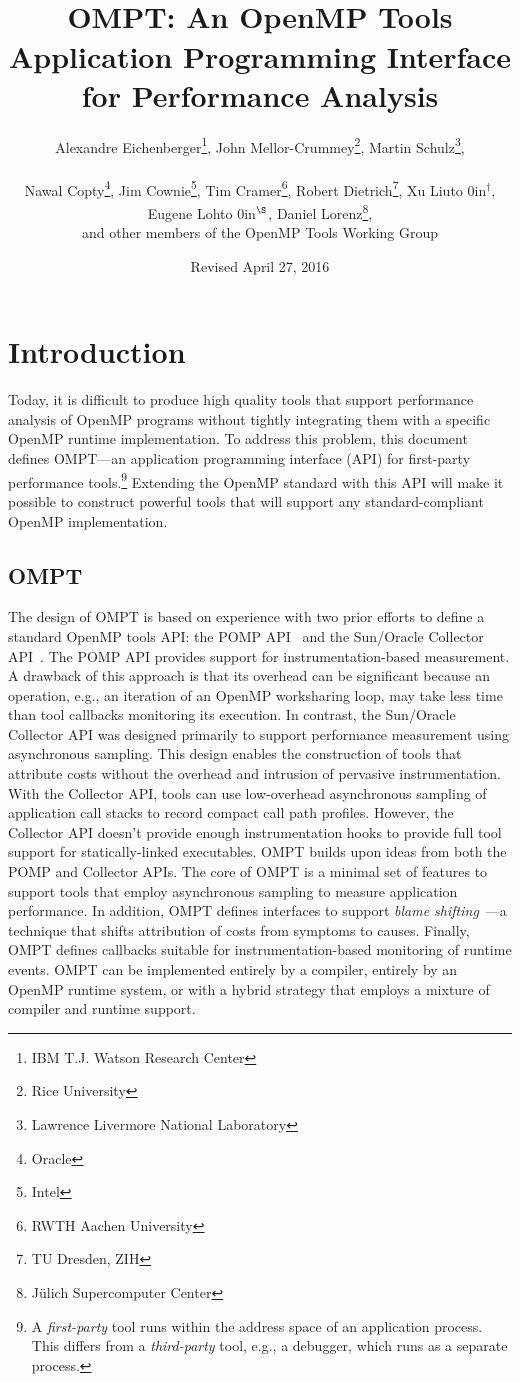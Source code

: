 \documentclass{article}
\title{OMPT: An OpenMP\textsuperscript{\textregistered} Tools Application Programming Interface for Performance Analysis}
\author{Alexandre Eichenberger\thanks{IBM T.J. Watson Research Center}, 
John Mellor-Crummey\thanks{Rice University}, 
Martin Schulz\thanks{Lawrence Livermore National Laboratory},
\\~\\
Nawal Copty\thanks{Oracle}, 
Jim Cownie\thanks{Intel},
Tim Cramer\thanks{RWTH Aachen University}, 
Robert Dietrich\thanks{TU Dresden, ZIH},
Xu Liu\hbox to 0in{$^\dagger$\hss},
Eugene Loh\hbox to 0in{$^\S$\hss}, 
Daniel Lorenz\thanks{J\"{u}lich Supercomputer Center}, 
\\
and other members of the OpenMP Tools Working Group}
\date{Revised April 27, 2016}
\begin{document}
  

                                           
\maketitle
\section{Introduction}
Today, it is difficult to produce high quality tools that support 
performance analysis of OpenMP programs without tightly integrating them with a specific OpenMP runtime implementation. To address this problem, this document defines OMPT---an application programming interface (API) for first-party performance tools.\footnote{A {\em first-party} tool runs within the address space of an application process. This differs from a {\em third-party} tool, e.g., a debugger, which runs as a separate process.}  
Extending the OpenMP standard with this API  will make it possible to construct powerful tools that will support any standard-compliant OpenMP implementation.

\subsection{OMPT}

The design of OMPT is based on experience with two prior efforts to define a standard OpenMP tools API: the POMP API~\cite{Mohr:EWOMP02} and the Sun/Oracle Collector API~\cite{SunCollector,Jost:2005:AND:1892830.1892858}. 
The POMP API provides support for instrumentation-based measurement. A drawback of this approach  is that its overhead can be significant because an operation, e.g., an iteration of an OpenMP worksharing loop, may take less time than tool callbacks monitoring its execution. 
In contrast, 
the Sun/Oracle Collector API was  designed primarily to support performance measurement 
using asynchronous sampling. This  design enables the construction of tools that attribute costs without the overhead and intrusion of pervasive instrumentation. With the Collector API, tools
 can use low-overhead asynchronous  sampling of application call stacks to record compact call path profiles. However, the Collector API doesn't provide enough instrumentation hooks to provide full tool support for statically-linked executables.
OMPT builds upon ideas from both the POMP and  Collector APIs. The core of OMPT is a minimal set of features to support tools that employ asynchronous sampling to measure application performance. In addition, OMPT defines  interfaces to support  {\em blame shifting}~\cite{Tallent:PPoPP09,Tallent:PPoPP10}---a technique that shifts attribution of costs from symptoms to causes.
Finally, OMPT defines callbacks suitable for instrumentation-based monitoring of runtime events. 
 OMPT can be implemented entirely by a compiler, entirely by an OpenMP runtime system, or with a hybrid strategy that employs a mixture of compiler and runtime support.
\end{document}
